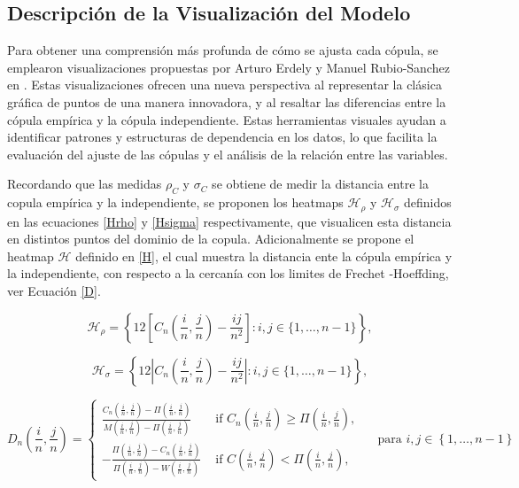 
\subsection{Descripción de la Visualización del Modelo}

Para obtener una comprensión más profunda de cómo se ajusta cada cópula, se emplearon visualizaciones propuestas por Arturo Erdely y Manuel Rubio-Sanchez en \cite{Erdely2022}. Estas visualizaciones ofrecen una nueva perspectiva al representar la clásica gráfica de puntos de una manera innovadora, y al resaltar las diferencias entre la cópula empírica y la cópula independiente. Estas herramientas visuales ayudan a identificar patrones y estructuras de dependencia en los datos, lo que facilita la evaluación del ajuste de las cópulas y el análisis de la relación entre las variables.

Recordando que las medidas $\rho_C$ y $\sigma_C$ se obtiene de medir la distancia entre la copula empírica y la independiente, se proponen los heatmaps $\mathscr{H}_\rho$ y $\mathscr{H}_\sigma$ definidos en las ecuaciones \eqref{Hrho} y \eqref{Hsigma} respectivamente, que visualicen esta distancia en distintos puntos del dominio de la copula. Adicionalmente se propone el heatmap $\mathscr{H}$ definido en \eqref{H}, el cual muestra la distancia ente la cópula empírica y la independiente, con respecto a la cercanía con los limites de Frechet -Hoeffding, ver Ecuación \eqref{D}.

\begin{equation}\label{Hrho}
    \mathscr{H}_\rho=\left\{12\left[C_n\left(\frac{i}{n}, \frac{j}{n}\right)-\frac{i j}{n^2}\right]: i, j \in\{1, \ldots, n-1\}\right\},
\end{equation}

\begin{equation}\label{Hsigma}
    \mathscr{H}_\sigma = \left\{12\left|C_n\left( \frac{i}{n}, \frac{j}{n}\right)-\frac{i j}{n^2}\right|: i, j \in\{1, \ldots, n-1\}\right\},
\end{equation}


\begin{equation}\label{D}
    D_n\left(\frac{i}{n}, \frac{j}{n}\right)=\left\{\begin{array}{cc}
\frac{C_n\left(\frac{i}{n}, \frac{j}{n}\right)-\Pi\left(\frac{i}{n}, \frac{j}{n}\right)}{M\left(\frac{i}{n}, \frac{j}{n}\right)-\Pi\left(\frac{i}{n}, \frac{j}{n}\right)} & \text { if } C_n\left(\frac{i}{n}, \frac{j}{n}\right) \geq \Pi\left(\frac{i}{n}, \frac{j}{n}\right), \\
-\frac{\Pi\left(\frac{i}{n}, \frac{j}{n}\right)-C_n\left(\frac{i}{n}, \frac{j}{n}\right)}{\Pi\left(\frac{i}{n}, \frac{j}{n}\right)-W\left(\frac{i}{n}, \frac{j}{n}\right)} & \text { if } C\left(\frac{i}{n}, \frac{j}{n}\right)<\Pi\left(\frac{i}{n}, \frac{j}{n}\right),
\end{array}\right. \quad \text{ para } i,j \in  \left\{ 1, \dots, n-1 \right\} 
\end{equation}

